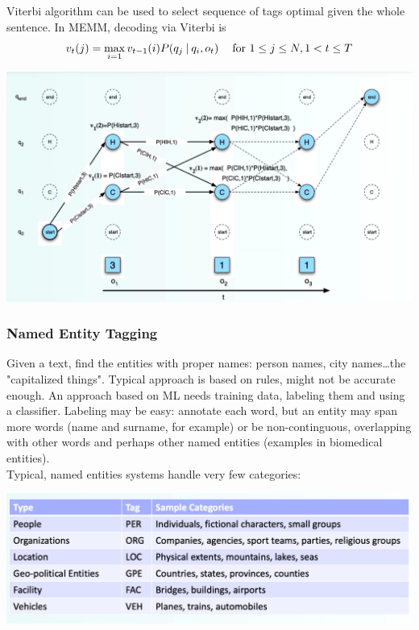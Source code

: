 \documentclass[10pt]{report}
\begin{document}
Viterbi algorithm can be used to select sequence of tags optimal given the whole sentence. In MEMM, decoding via Viterbi is
$$v_t(j) = \max_{i=1} v_{t-1}(i)P(q_j\:|\:q_i, o_t)\:\:\:\:\hbox{ for } 1\leq j\leq N, 1< t\leq T$$
\begin{center}
	\includegraphics[scale=0.5]{19.png}
\end{center}
\subsubsection{Named Entity Tagging}
Given a text, find the entities with proper names: person names, city names\ldots the "capitalized things". Typical approach is based on rules, might not be accurate enough. An approach based on ML needs training data, labeling them and using a classifier. Labeling may be easy: annotate each word, but an entity may span more words (name and surname, for example) or be non-continguous, overlapping with other words and perhaps other named entities (examples in biomedical entities).\\
Typical, named entities systems handle very few categories:
\begin{center}
	\includegraphics[scale=0.33]{20.png} %
\end{center}
\end{document}

